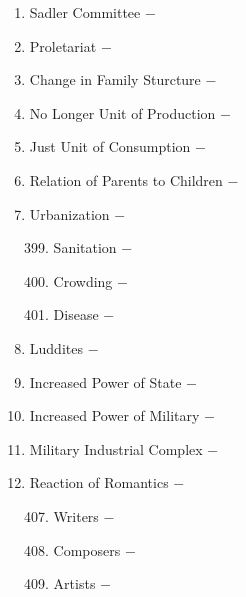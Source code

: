 \documentclass[12pt]{article}
\begin{document}
\begin{enumerate}
\begin{enumerate}[label=\arabic{*}.]
\end{enumerate}
\setcounter{enumi}{391}

\item Sadler Committee $-$ 

\item Proletariat $-$ 

\item Change in Family Sturcture $-$ 

\item No Longer Unit of Production $-$ 

\item Just Unit of Consumption $-$ 

\item Relation of Parents to Children $-$ 

\item Urbanization $-$ 

\begin{enumerate}[label=\arabic{*}.]
\setcounter{enumii}{398}

\item Sanitation $-$

\item Crowding $-$

\item Disease $-$ 


\end{enumerate}
\setcounter{enumi}{401}

\item Luddites $-$ 

\item Increased Power of State $-$ 

\item Increased Power of Military $-$ 

\item Military Industrial Complex $-$ 

\item Reaction of Romantics $-$ 

\begin{enumerate}[label=\arabic{*}.]
\setcounter{enumii}{406}

\item Writers $-$ 

\item Composers $-$ 

\item Artists $-$  


\end{enumerate}
\setcounter{enumi}{409}


\end{enumerate}
\end{document}
